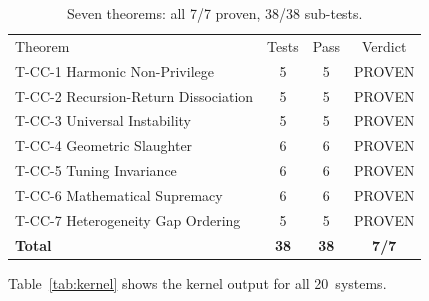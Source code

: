 \documentclass[
  aps,
  prd,
  twocolumn,
  superscriptaddress,
  nofootinbib,
  floatfix
]{revtex4-2}
\begin{document}
\begin{table}[h]
\caption{Seven theorems: all 7/7 proven, 38/38 sub-tests.}
\label{tab:summary}
\begin{ruledtabular}
\begin{tabular}{lccc}
\textrm{Theorem} & \textrm{Tests} & \textrm{Pass} & \textrm{Verdict} \\
\colrule
T-CC-1 Harmonic Non-Privilege       & 5  & 5  & PROVEN \\
T-CC-2 Recursion-Return Dissociation & 5  & 5  & PROVEN \\
T-CC-3 Universal Instability        & 5  & 5  & PROVEN \\
T-CC-4 Geometric Slaughter          & 6  & 6  & PROVEN \\
T-CC-5 Tuning Invariance            & 6  & 6  & PROVEN \\
T-CC-6 Mathematical Supremacy       & 6  & 6  & PROVEN \\
T-CC-7 Heterogeneity Gap Ordering   & 5  & 5  & PROVEN \\
\colrule
\textbf{Total}                       & \textbf{38} & \textbf{38} & \textbf{7/7} \\
\end{tabular}
\end{ruledtabular}
\end{table}

Table~\ref{tab:kernel} shows the kernel output for all 20~systems.
\end{document}
